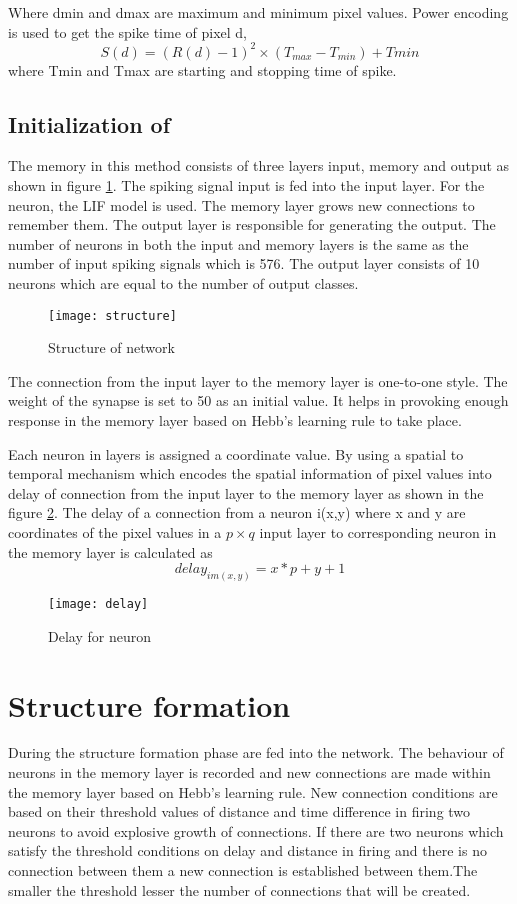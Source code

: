 Where d{min} and d{max} are maximum and minimum pixel values. Power encoding is
used to get the spike time of pixel d,
\begin{equation*}
    S(d)=(R(d)-1)^2 \times (T_{max}-T_{min})+T{min}
\end{equation*}
where T{min} and T{max} are starting and stopping time of spike.
\subsection{Initialization of \Snn}
The memory \nn in this method consists of three layers input, memory and output
as shown in figure \ref{structure}. The spiking signal input is fed into the
input layer. For the neuron, the LIF model is used. The memory layer grows new
connections to remember them. The output layer is responsible for generating
the output. The number of neurons in both the input and memory layers is the
same as the number of input spiking signals which is 576. The output layer
consists of 10 neurons which are equal to the number of output classes.
\begin{figure}[h!]
    \centering
    \texttt{[image: structure]}
    \caption{Structure of network}
    \label{structure}
\end{figure}

The connection from the input layer to the memory layer is one-to-one style.
The weight of the synapse is set to 50 as an initial value. It helps in
provoking enough response in the memory layer based on Hebb's learning
rule\cite{hebbs} to take place.

Each neuron in layers is assigned a coordinate value. By using a spatial to
temporal mechanism which encodes the spatial information of pixel values into
delay of connection from the input layer to the memory layer as shown in the
figure \ref{delay}. The delay of a connection from a neuron i(x,y) where x and
y are coordinates of the pixel values in a $p \times q$ input layer to
corresponding neuron in the memory layer is calculated as
\begin{equation*}
    delay_{im(x,y)}=x*p+y+1
\end{equation*}
\begin{figure}[h!]
    \centering
    \texttt{[image: delay]}
    \caption{Delay for neuron}
    \label{delay}
\end{figure}
\section{Structure formation}
During the structure formation phase are fed into the network. The behaviour of
neurons in the memory layer is recorded and new connections are made within the
memory layer based on Hebb's learning rule\cite{hebbs}. New connection
conditions are based on their threshold values of distance and time difference
in firing two neurons to avoid explosive growth of connections. If there are
two neurons which satisfy the threshold conditions on delay and distance in
firing and there is no connection between them a new connection is established
between them.The smaller the threshold lesser the number of connections that
will be created.

